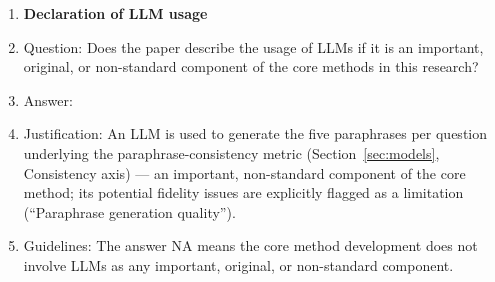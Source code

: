 \documentclass{article}
\begin{document}
\begin{enumerate}
\item {\bf Declaration of LLM usage}
    \item[] Question: Does the paper describe the usage of LLMs if it is an important, original, or non-standard component of the core methods in this research?
    \item[] Answer: \answerYes{}
    \item[] Justification: An LLM is used to generate the five paraphrases per question underlying the paraphrase-consistency metric (Section~\ref{sec:models}, Consistency axis) --- an important, non-standard component of the core method; its potential fidelity issues are explicitly flagged as a limitation (``Paraphrase generation quality'').
    \item[] Guidelines: The answer NA means the core method development does not involve LLMs as any important, original, or non-standard component.

\end{enumerate}
\end{document}

